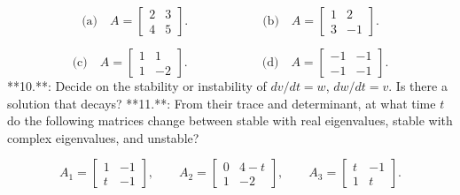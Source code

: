 \[\text{(a)}\quad A=\begin{bmatrix}2&3\\ 4&5\end{bmatrix}.\qquad\qquad\qquad\text{(b)}\quad A=\begin{bmatrix}1&2\\ 3&-1\end{bmatrix}.\]

\[\text{(c)}\quad A=\begin{bmatrix}1&1\\ 1&-2\end{bmatrix}.\qquad\qquad\qquad\text{(d)}\quad A=\begin{bmatrix}-1&-1\\ -1&-1\end{bmatrix}.\]
**10.**: Decide on the stability or instability of \(dv/dt=w\), \(dw/dt=v\). Is there a solution that decays?
**11.**: From their trace and determinant, at what time \(t\) do the following matrices change between stable with real eigenvalues, stable with complex eigenvalues, and unstable?

\[A_{1}=\begin{bmatrix}1&-1\\ t&-1\end{bmatrix},\qquad A_{2}=\begin{bmatrix}0&4-t\\ 1&-2\end{bmatrix},\qquad A_{3}=\begin{bmatrix}t&-1\\ 1&t\end{bmatrix}.\]